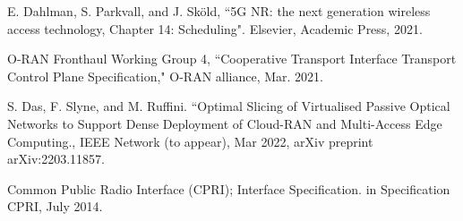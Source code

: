 \documentclass[a4paper, oneside, twocolumn, notitlepage, 10pt]{extarticle_ecoc}
\begin{document}
\begin{thebibliography}{99}
	E. Dahlman, S. Parkvall, and J. Sk\"{o}ld, ``5G NR: the next generation wireless access technology, Chapter 14: Scheduling". Elsevier, Academic Press, 2021.

	 O-RAN Fronthaul Working Group 4, ``Cooperative Transport Interface Transport Control Plane Specification," O-RAN alliance, Mar. 2021.

	S. Das, F. Slyne, and M. Ruffini. ``Optimal Slicing of Virtualised Passive Optical Networks to Support Dense Deployment of Cloud-RAN and Multi-Access Edge Computing., IEEE Network (to appear), Mar 2022, arXiv preprint arXiv:2203.11857.

	 Common Public Radio Interface (CPRI); Interface Specification.
	in Specification CPRI, July 2014.

\end{thebibliography}
\end{document}
